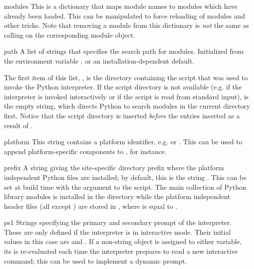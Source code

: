 \begin{datadesc}{modules}
  This is a dictionary that maps module names to modules which have
  already been loaded.  This can be manipulated to force reloading of
  modules and other tricks.  Note that removing a module from this
  dictionary is \emph{not} the same as calling
   on the corresponding module
  object.
\end{datadesc}

\begin{datadesc}{path}
  A list of strings that specifies the search path for modules.
  Initialized from the environment variable , or an
  installation-dependent default.  

The first item of this list, , is the 
directory containing the script that was used to invoke the Python 
interpreter.  If the script directory is not available (e.g.  if the 
interpreter is invoked interactively or if the script is read from 
standard input),  is the empty string, which directs 
Python to search modules in the current directory first.  Notice that 
the script directory is inserted \emph{before} the entries inserted as 
a result of .  
\end{datadesc}

\begin{datadesc}{platform}
This string contains a platform identifier, e.g.  or
.  This can be used to append platform-specific
components to , for instance. 
\end{datadesc}

\begin{datadesc}{prefix}
A string giving the site-specific directory prefix where the platform
independent Python files are installed; by default, this is the string
.  This can be set at build time with the
 argument to the  script.  The main
collection of Python library modules is installed in the directory
 while the platform
independent header files (all except ) are stored in
,
where  is equal to .

\end{datadesc}

\begin{datadesc}{ps1}
  Strings specifying the primary and secondary prompt of the
  interpreter.  These are only defined if the interpreter is in
  interactive mode.  Their initial values in this case are
   and .  If a non-string object is assigned
  to either variable, its  is re-evaluated each time
  the interpreter prepares to read a new interactive command; this can
  be used to implement a dynamic prompt.
\end{datadesc}


